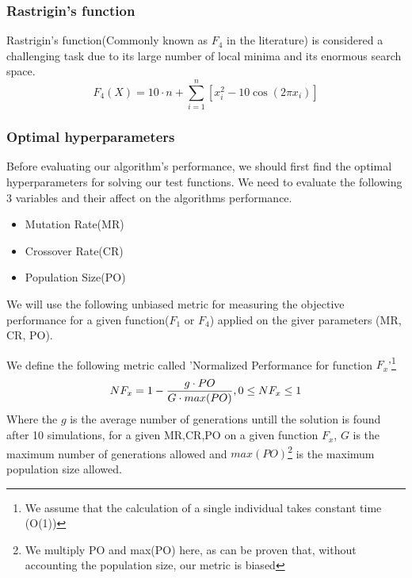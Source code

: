 \documentclass[openany]{article}
\begin{document}
			\subsubsection{Rastrigin's function}
				Rastrigin’s function(Commonly known as $F_{4}$ in the literature\cite{performance}) is considered a challenging task due to its large number of local minima and its enormous search space.
				\begin{equation}
				F_4(X)=10\cdot n+\sum_{i=1}^{n}[x_{i}^{2}-10\cos(2\pi x_{i})]
				\end{equation}
			\subsubsection{Optimal hyperparameters}
				Before evaluating our algorithm's performance, we should first find the optimal hyperparameters for solving our test functions.
				We need to evaluate the following 3 variables and their affect on the algorithms performance.
				\begin{itemize}
					\item Mutation Rate(MR)
					\item Crossover Rate(CR)
					\item Population Size(PO)
				\end{itemize}
				We will use the following unbiased metric for measuring the objective performance for a given function($F_1$ or $F_4$) applied on the giver parameters (MR, CR, PO).
				\pagebreak
				\begin{definition}
					We define the following metric called 'Normalized Performance for function $F_{x}$'\footnote{We assume that the calculation of a single individual takes constant time (O(1))}
					\begin{equation}
						NF_{x}=1-\frac{g\cdot PO}{G\cdot max(PO)},\space 0\le NF_{x}\le 1
					\end{equation}
					Where the $g$ is the average number of generations untill the solution is found after 10 simulations, for a given MR,CR,PO on a given function $F_{x}$, $G$ is
					the maximum number of generations allowed and $max(PO)$\footnote{We multiply PO and max(PO) here, as can be proven that, without accounting the population size, our metric is biased} is the maximum population size allowed.
				\end{definition}
\end{document}

